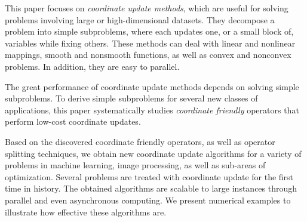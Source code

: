This paper focuses on  \emph{coordinate update methods}, which are useful for solving problems involving large or high-dimensional datasets. They decompose a problem into simple subproblems, where each  updates one, or a small block of, variables while fixing others. These methods can deal with linear and nonlinear mappings,  smooth and nonsmooth functions, as well as convex and nonconvex problems. In addition, they are easy to parallel.  %

The great performance of coordinate update methods depends on solving simple subproblems. To derive simple subproblems for several new classes of applications, this paper systematically studies  \emph{coordinate friendly} operators that perform low-cost coordinate updates. 


Based on the discovered coordinate friendly operators, as well as operator splitting techniques, we obtain new coordinate update algorithms for a variety of problems in machine learning, image processing, as well as sub-areas of optimization. Several problems are treated with coordinate update for the first time in history. The obtained algorithms are scalable to  large instances through parallel and even asynchronous computing. We present numerical examples to illustrate how effective these algorithms are.

